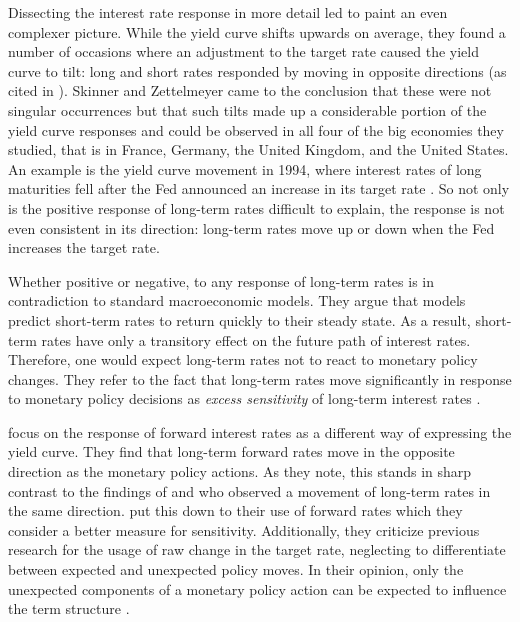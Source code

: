 \documentclass[11pt,a4paper,english,oneside]{book}
\numberwithin{equation}{chapter}
\begin{document}
Dissecting the interest rate response in more detail led \cite{Skinner.1995} to paint an even complexer picture. While the yield curve shifts upwards on average, they found a number of occasions where an adjustment to the target rate caused the yield curve to tilt: long and short rates responded by moving in opposite directions (as cited in \citealp[p. 1]{Ellingsen.2003}). Skinner and Zettelmeyer came to the conclusion that these were not singular occurrences but that such tilts made up a considerable portion of the yield curve responses and could be observed in all four of the big economies they studied, that is in France, Germany, the United Kingdom, and the United States. An example is the yield curve movement in 1994, where interest rates of long maturities fell after the Fed announced an increase in its target rate \citep[~p. 1594]{Ellingsen.2001}. So not only is the positive response of long-term rates difficult to explain, the response is not even consistent in its direction: long-term rates move up or down when the Fed increases the target rate. 

Whether positive or negative, to \citet[p. 425]{Gurkaynak.2005} any response of long-term rates is in contradiction to standard macroeconomic models. They argue that models predict short-term rates to return quickly to their steady state. As a result, short-term rates have only a transitory effect on the future path of interest rates. Therefore, one would expect long-term rates not to react to monetary policy changes. They refer to the fact that long-term rates move significantly in response to monetary policy decisions as \textit{excess sensitivity} of long-term interest rates \cite[p. 2]{Gurkaynak.2003}.

\citet[pp. 426--427]{Gurkaynak.2005} focus on the response of forward interest rates as a different way of expressing the yield curve. They find that long-term forward rates move in the opposite direction as the monetary policy actions. As they note, this stands in sharp contrast to the findings of \cite{Cook.1989} and \cite{Romer.2000} who observed a movement of long-term rates in the same direction. \citeauthor{Gurkaynak.2005} put this down to their use of forward rates which they consider a better measure for sensitivity. %
Additionally, they criticize previous research for the usage of raw change in the target rate, neglecting to differentiate between expected and unexpected policy moves. In their opinion, only the unexpected components of a monetary policy action can be expected to influence the term structure \citep[pp. 430--431]{Gurkaynak.2005}.
\end{document}
